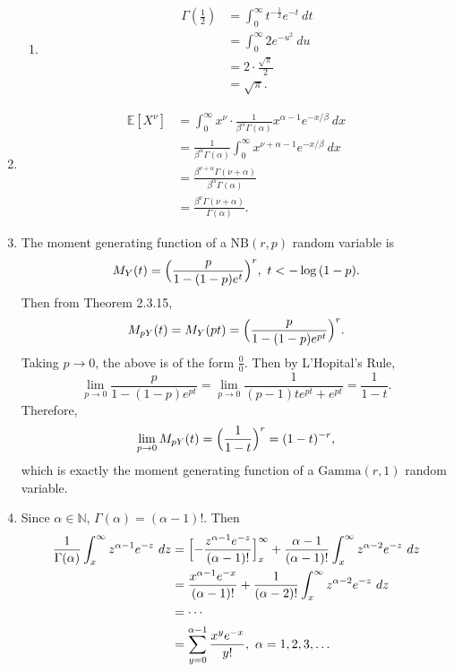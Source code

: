 \documentclass{article}
\begin{document}
\begin{enumerate}
\begin{enumerate}
        \item \begin{align*}
            \Gamma(\frac{1}{2})
            &= \int_{0}^{\infty} t^{-\frac{1}{2}} e^{-t} \ dt \\
            &= \int_{0}^{\infty} 2e^{-u^2} \ du \\
            &= 2 \cdot \frac{\sqrt{\pi}}{2} \\
            &= \sqrt{\pi}.
        \end{align*}
    \end{enumerate}

    \item \begin{align*}
        \mathbb{E}[X^{\nu}]
        &= \int_{0}^{\infty} x^{\nu} \cdot \frac{1}{\beta^{\alpha} \Gamma(\alpha)} 
        x^{\alpha - 1} e^{-x/\beta} \ dx \\
        &= \frac{1}{\beta^{\alpha} \Gamma(\alpha)} \int_{0}^{\infty} 
        x^{\nu + \alpha - 1} e^{-x/\beta} \ dx \\
        &= \frac{\beta^{\nu + \alpha} \Gamma(\nu + \alpha)}{\beta^{\alpha} \Gamma(\alpha)} \\
        &= \frac{\beta^{\nu} \Gamma(\nu + \alpha)}{\Gamma(\alpha)}.
    \end{align*}

    \item The moment generating function of a $\text{NB}(r, p)$ random variable is 
    \[ M_{Y}(t) = \Bigl( \frac{p}{1 - (1 - p)e^{t}} \Bigr)^{r}, \ t < -\log{(1 - p)}. \]
    Then from Theorem 2.3.15, 
    \[ M_{pY}(t) = M_{Y}(pt) = \Bigl( \frac{p}{1 - (1 - p)e^{pt}} \Bigr)^{r}. \]
    Taking $p \to 0$, the above is of the form $\frac{0}{0}$. Then by L'Hopital's Rule, 
    \[ \lim_{p \to 0} \frac{p}{1 - (1 - p)e^{pt}} 
    = \lim_{p \to 0} \frac{1}{(p - 1)te^{pt} + e^{pt}} = \frac{1}{1 - t}. \]
    Therefore, 
    \[ \lim_{p \to 0} M_{pY}(t) = \Bigl( \frac{1}{1 - t} \Bigr)^{r} = (1 - t)^{-r}, \]
    which is exactly the moment generating function of a $\text{Gamma}(r, 1)$ random variable.

    \item Since $\alpha \in \mathbb{N}$, $\Gamma(\alpha) = (\alpha - 1)!$. Then 
    \begin{align*}
        \frac{1}{\Gamma(\alpha)} \int_{x}^{\infty} z^{\alpha - 1} e^{-z} \ dz
        &= \Bigl[ -\frac{z^{\alpha - 1}e^{-z}}{(\alpha - 1)!} \Bigr]_{x}^{\infty} 
        + \frac{\alpha - 1}{(\alpha - 1)!} \int_{x}^{\infty} z^{\alpha - 2}e^{-z} \ dz \\
        &= \frac{x^{\alpha - 1}e^{-x}}{(\alpha - 1)!} 
        + \frac{1}{(\alpha - 2)!} \int_{x}^{\infty} z^{\alpha - 2}e^{-z} \ dz \\
        &= \cdots \\
        &= \sum_{y = 0}^{\alpha - 1} \frac{x^{y}e^{-x}}{y!}, \ \alpha = 1, 2, 3, \dots
    \end{align*}


\end{enumerate}
\end{document}
